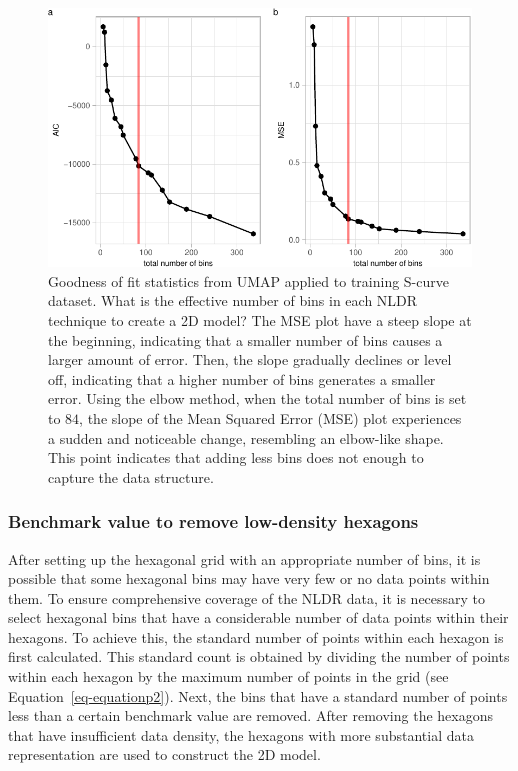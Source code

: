 \documentclass[
  12pt]{article}
\begin{document}
\begin{figure}

{\centering \includegraphics{paper_files/figure-pdf/fig-diagnosticpltScurve-1.pdf}

}

\caption{\label{fig-diagnosticpltScurve}Goodness of fit statistics from
UMAP applied to training S-curve dataset. What is the effective number
of bins in each NLDR technique to create a 2D model? The MSE plot have a
steep slope at the beginning, indicating that a smaller number of bins
causes a larger amount of error. Then, the slope gradually declines or
level off, indicating that a higher number of bins generates a smaller
error. Using the elbow method, when the total number of bins is set to
\(84\), the slope of the Mean Squared Error (MSE) plot experiences a
sudden and noticeable change, resembling an elbow-like shape. This point
indicates that adding less bins does not enough to capture the data
structure.}

\end{figure}

\hypertarget{benchmark-value-to-remove-low-density-hexagons}{%
\subsubsection{Benchmark value to remove low-density
hexagons}\label{benchmark-value-to-remove-low-density-hexagons}}

After setting up the hexagonal grid with an appropriate number of bins,
it is possible that some hexagonal bins may have very few or no data
points within them. To ensure comprehensive coverage of the NLDR data,
it is necessary to select hexagonal bins that have a considerable number
of data points within their hexagons. To achieve this, the standard
number of points within each hexagon is first calculated. This standard
count is obtained by dividing the number of points within each hexagon
by the maximum number of points in the grid (see
Equation~\ref{eq-equationp2}). Next, the bins that have a standard
number of points less than a certain benchmark value are removed. After
removing the hexagons that have insufficient data density, the hexagons
with more substantial data representation are used to construct the 2D
model.
\end{document}
